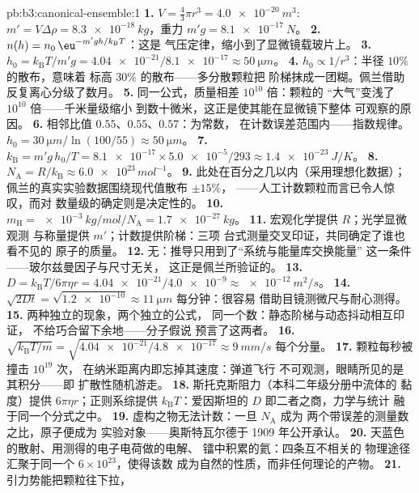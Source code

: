 \begin{solution}{pb:b3:canonical-ensemble:1}
\textbf{1.} $V = \tfrac43\pi r^3 = \qty{4.0e-20}{m^3}$: $m' = V
\Delta\rho = \qty{8.3e-18}{kg}$，重力 $m'g = \qty{8.1e-17}{N}$。
\textbf{2.} $n(h) = n_0\,\eu^{-m'gh/k_{\text{B}}T}$：这是
气压定律，缩小到了显微镜载玻片上。
\textbf{3.} $h_0 = k_{\text{B}}T/m'g = \num{4.04e-21}/\num{8.1e-17}
\approx \qty{50}{\micro m}$。
\textbf{4.} $h_0 \propto 1/r^3$：半径 $10\%$ 的散布，意味着
标高 $30\%$ 的散布——多分散颗粒把
阶梯抹成一团糊。佩兰借助
反复离心分级了数月。
\textbf{5.} 同一公式，质量相差 $10^{10}$ 倍：颗粒的
“大气”变浅了 $10^{10}$ 倍——千米量级缩小
到数十微米，这正是使其能在显微镜下整体
可观察的原因。
\textbf{6.} 相邻比值 $0.55$、$0.55$、$0.57$：为常数，
在计数误差范围内——指数规律。$h_0 =
\qty{30}{\micro m}/\ln(100/55) \approx \qty{50}{\micro m}$。
\textbf{7.} $k_{\text{B}} = m'g\,h_0/T = \num{8.1e-17} \times
\num{5.0e-5}/293 \approx \qty{1.4e-23}{J/K}$。
\textbf{8.} $N_{\text{A}} = R/k_{\text{B}} \approx
\num{6.0e23}\,\unit{mol^{-1}}$。
\textbf{9.} 此处在百分之几以内（采用理想化数据）；
佩兰的真实实验数据围绕现代值散布 $\pm15\%$，
——人工计数颗粒而言已令人惊叹，而对
数量级的确定则是决定性的。
\textbf{10.} $m_{\text{H}} = \qty{e-3}{kg/mol}/N_{\text{A}} =
\qty{1.7e-27}{kg}$。
\textbf{11.} 宏观化学提供 $R$；光学显微观测
与称量提供 $m'$；计数提供阶梯：三项
台式测量交叉印证，共同确定了谁也看不见的
原子的质量。
\textbf{12.} 无：推导只用到了“系统与能量库交换能量”
这一条件——玻尔兹曼因子与尺寸无关，
这正是佩兰所验证的。
\textbf{13.} $D = k_{\text{B}}T/6\pi\eta r =
\num{4.04e-21}/\num{4.0e-9} \approx \qty{e-12}{m^2/s}$。
\textbf{14.} $\sqrt{2Dt} = \sqrt{\num{1.2e-10}} \approx
\qty{11}{\micro m}$ 每分钟：很容易
借助目镜测微尺与耐心测得。
\textbf{15.} 两种独立的现象，两个独立的公式，
同一个数：静态阶梯与动态抖动相互印证，
不给巧合留下余地——分子假说
预言了这两者。
\textbf{16.} $\sqrt{k_{\text{B}}T/m} = \sqrt{\num{4.04e-21}/
\num{4.8e-17}} \approx \qty{9}{mm/s}$ 每个分量。
\textbf{17.} 颗粒每秒被撞击 $10^{19}$ 次，
在纳米距离内即忘掉其速度：弹道飞行
不可观测，眼睛所见的是其积分——即
扩散性随机游走。
\textbf{18.} 斯托克斯阻力（本科二年级分册中流体的
黏度）提供 $6\pi\eta r$；正则系综提供
$k_{\text{B}}T$：爱因斯坦的 $D$ 即二者之商，力学与统计
融于同一个分式之中。
\textbf{19.} 虚构之物无法计数：一旦 $N_{\text{A}}$ 成为
两个带误差的测量数之比，原子便成为
实验对象——奥斯特瓦尔德于 1909 年公开承认。
\textbf{20.} 天蓝色的散射、用测得的电子电荷做的电解、
镭中积累的氦：四条互不相关的
物理途径汇聚于同一个 $6\times10^{23}$，使得该数
成为自然的性质，而非任何理论的产物。
\textbf{21.} 引力势能把颗粒往下拉，

\end{solution}
